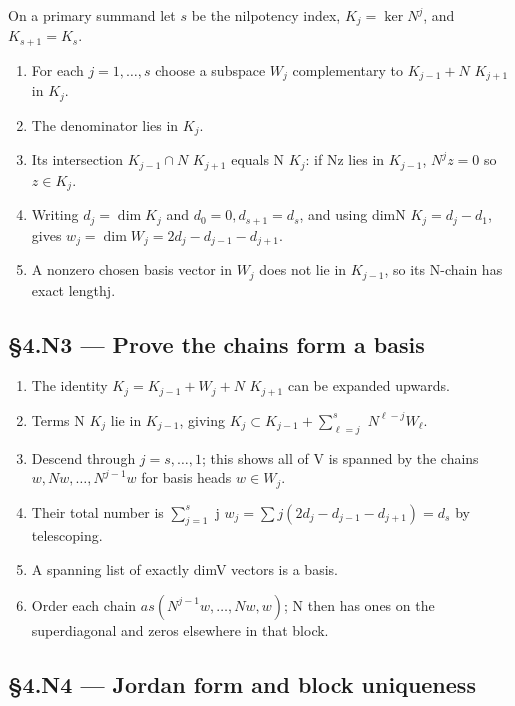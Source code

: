 \documentclass[preprint,12pt,aps,pra,showkeys,amsmath,amssymb,superscriptaddress,floatfix]{revtex4-2}
\theoremstyle{definition}
\theoremstyle{remark}
\begin{document}
On a primary summand let \(s\) be the nilpotency index,
\(K_j=\ker N^j\), and \(K_{s+1}=K_s\).

\begin{enumerate}
\def\labelenumi{\arabic{enumi}.}
\item
  For each \(j=1,\ldots ,s\) choose a subspace \(W_j\) complementary to
  \(K_{j-1}+N\) \(K_{j+1}\) in \(K_j\).
\item
  The denominator lies in \(K_j\).
\item
  Its intersection \(K_{j-1}\cap N\) \(K_{j+1}\) equals N \(K_j\): if Nz
  lies in \(K_{j-1}\), \(N^jz=0\) so \(z\in K_j\).
\item
  Writing \(d_j=\operatorname{dim} K_j\) and \(d_{0}=0,d_{s+1}=d_s\),
  and using dimN \(K_j=d_j-d_{1}\), gives
  \(w_j=\operatorname{dim} W_j=2d_j-d_{j-1}-d_{j+1}\).
\item
  A nonzero chosen basis vector in \(W_j\) does not lie in \(K_{j-1}\),
  so its N-chain has exact lengthj.
\end{enumerate}

\subsection{§4.N3 --- Prove the chains form a
basis}\label{n3-prove-the-chains-form-a-basis}

\begin{enumerate}
\def\labelenumi{\arabic{enumi}.}
\item
  The identity \(K_j=K_{j-1}+W_j+N\) \(K_{j+1}\) can be expanded
  upwards.
\item
  Terms N \(K_j\) lie in \(K_{j-1}\), giving
  \(K_j\subset K_{j-1}+\sum _{\ell =j}^s\) \(N^{\ell -j}W_\ell\).
\item
  Descend through \(j=s,\ldots ,1\); this shows all of V is spanned by
  the chains \(w,Nw,\ldots ,N^{j-1}w\) for basis heads \(w\in W_j\).
\item
  Their total number is \(\sum _{j=1}^s\) j
  \(w_j=\sum j(2d_j-d_{j-1}-d_{j+1})=d_s\) by telescoping.
\item
  A spanning list of exactly dimV vectors is a basis.
\item
  Order each chain \(as(N^{j-1}w,\ldots ,Nw,w)\); N then has ones on the
  superdiagonal and zeros elsewhere in that block.
\end{enumerate}

\subsection{§4.N4 --- Jordan form and block
uniqueness}\label{n4-jordan-form-and-block-uniqueness}
\end{document}
